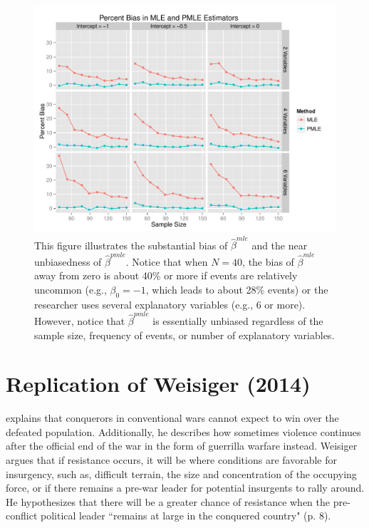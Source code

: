 \documentclass[12pt]{article}
\begin{document}
\begin{figure}[H]
\begin{center}
\includegraphics[width = \textwidth]{figs/sims-coef-perc-bias.pdf}
\caption{This figure illustrates the substantial bias of $\hat{\beta}^{mle}$ and the near unbiasedness of $\hat{\beta}^{pmle}$. Notice that when $N = 40$, the bias of $\hat{\beta}^{mle}$ away from zero is about 40\% or more if events are relatively uncommon (e.g., $\beta_0 = -1$, which leads to about 28\% events) or the researcher uses several explanatory variables (e.g., 6 or more). However, notice that $\hat{\beta}^{pmle}$ is essentially unbiased regardless of the sample size, frequency of events, or number of explanatory variables.}\label{fig:sims-coef-perc-bias}
\end{center}
\end{figure}

\section*{Replication of Weisiger (2014)}

\citet{Weisiger2014} explains that conquerors in conventional wars cannot expect to win over the defeated population. Additionally, he describes how sometimes violence continues after the official end of the war in the form of guerrilla warfare instead. Weisiger argues that if resistance occurs, it will be where conditions are favorable for insurgency, such as, difficult terrain, the size and concentration of the occupying force, or if there remains a pre-war leader for potential insurgents to rally around. He hypothesizes that there will be a greater chance of resistance when the pre-conflict political leader ``remains at large in the conquered country" (p. 8).
\end{document}
